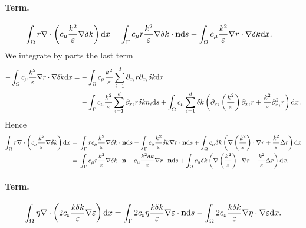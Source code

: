 \documentclass[oneside,11pt]{book}
\numberwithin{equation}{section}
\begin{document}
\paragraph*{Term.}
\begin{align*}
    \int_\Omega r\nabla\cdot\left(c_\mu\frac{k^2}{\varepsilon}\nabla\delta k\right){\rm d}x &= \int_\Gamma c_\mu r\frac{k^2}{\varepsilon}\nabla\delta k\cdot{\bf n}{\rm d}s - \int_\Omega c_\mu\frac{k^2}{\varepsilon}\nabla r\cdot\nabla\delta k{\rm d}x.
\end{align*}
We integrate by parts the last term
\begin{align*}
    -\int_\Omega c_\mu\frac{k^2}{\varepsilon}\nabla r\cdot\nabla\delta k{\rm d}x &= -\int_\Omega c_\mu\frac{k^2}{\varepsilon}\sum_{i=1}^d \partial_{x_i}r\partial_{x_i}\delta k{\rm d}x\\
    &= -\int_\Gamma c_\mu\frac{k^2}{\varepsilon}\sum_{i=1}^d \partial_{x_i}r\delta kn_i{\rm d}s + \int_\Omega c_\mu\sum_{i=1}^d \delta k\left(\partial_{x_i}\left(\frac{k^2}{\varepsilon}\right)\partial_{x_i}r + \frac{k^2}{\varepsilon}\partial_{x_i}^2r\right){\rm d}x.
\end{align*}
Hence
\begin{align*}
    \int_\Omega r\nabla\cdot\left(c_\mu\frac{k^2}{\varepsilon}\nabla\delta k\right){\rm d}x =&\ \int_\Gamma rc_\mu\frac{k^2}{\varepsilon}\nabla\delta k\cdot{\bf n}{\rm d}s - \int_\Gamma c_\mu\frac{k^2}{\varepsilon}\delta k\nabla r\cdot{\bf n}{\rm d}s +\int_\Omega c_\mu\delta k\left(\nabla\left(\frac{k^2}{\varepsilon}\right)\cdot\nabla r + \frac{k^2}{\varepsilon}\Delta r\right){\rm d}x\\
    =&\ \int_\Gamma c_\mu r\frac{k^2}{\varepsilon}\nabla\delta k\cdot{\bf n} - c_\mu\frac{k^2\delta k}{\varepsilon}\nabla r\cdot{\bf n}{\rm d}s + \int_\Omega c_\mu\delta k\left(\nabla\left(\frac{k^2}{\varepsilon}\right)\cdot\nabla r + \frac{k^2}{\varepsilon}\Delta r\right){\rm d}x.
\end{align*}
\paragraph*{Term.}
\begin{align*}
    \int_\Omega \eta\nabla\cdot\left(2c_\varepsilon\frac{k\delta k}{\varepsilon}\nabla\varepsilon\right){\rm d}x = \int_\Gamma 2c_\varepsilon\eta\frac{k\delta k}{\varepsilon}\nabla\varepsilon\cdot{\bf n}{\rm d}s - \int_\Omega 2c_\varepsilon\frac{k\delta k}{\varepsilon}\nabla\eta\cdot\nabla\varepsilon{\rm d}x.
\end{align*}
\end{document}
